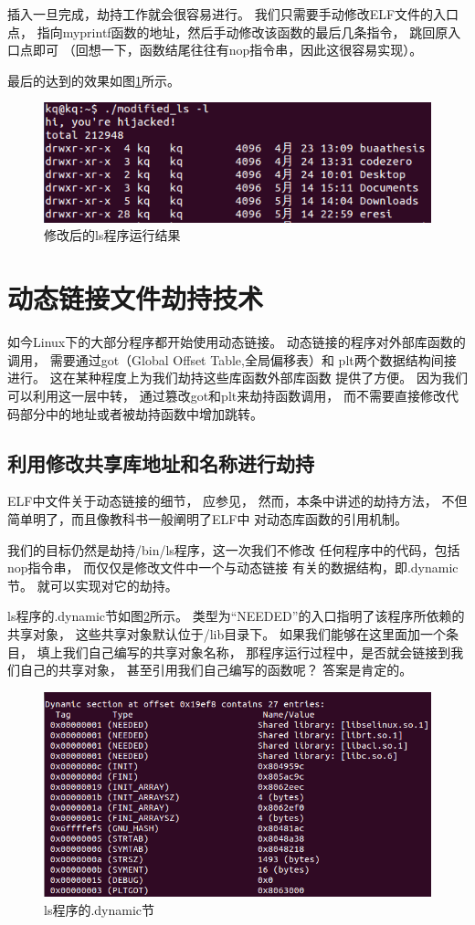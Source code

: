 插入一旦完成，劫持工作就会很容易进行。
我们只需要手动修改ELF文件的入口点，
指向myprintf函数的地址，然后手动修改该函数的最后几条指令，
跳回原入口点即可
（回想一下，函数结尾往往有nop指令串，因此这很容易实现）。

最后的达到的效果如图\ref{ls}所示。

\begin{figure}[h!]
    \centering
    \includegraphics[width=.6\textwidth]{figure/ls.png}
    \caption{修改后的ls程序运行结果}
    \label{ls}
\end{figure}

\section{动态链接文件劫持技术}

如今Linux下的大部分程序都开始使用动态链接。
动态链接的程序对外部库函数的调用，
需要通过got（Global Offset Table,全局偏移表）和
plt两个数据结构间接进行。
这在某种程度上为我们劫持这些库函数外部库函数
提供了方便。
因为我们可以利用这一层中转，
通过篡改got和plt来劫持函数调用，
而不需要直接修改代码部分中的地址或者被劫持函数中增加跳转。

\subsection{利用修改共享库地址和名称进行劫持}

ELF中文件关于动态链接的细节，
应参见\cite{elf1.2}，
然而，本条中讲述的劫持方法，
不但简单明了，而且像教科书一般阐明了ELF中
对动态库函数的引用机制。

我们的目标仍然是劫持/bin/ls程序，这一次我们不修改
任何程序中的代码，包括nop指令串，
而仅仅是修改文件中一个与动态链接
有关的数据结构，即.dynamic节。
就可以实现对它的劫持。

ls程序的.dynamic节如图\ref{lsdyn1}所示。
类型为“NEEDED”的入口指明了该程序所依赖的共享对象，
这些共享对象默认位于/lib目录下。
如果我们能够在这里面加一个条目，
填上我们自己编写的共享对象名称，
那程序运行过程中，是否就会链接到我们自己的共享对象，
甚至引用我们自己编写的函数呢？
答案是肯定的。

\begin{figure}[h!]
    \centering
    \includegraphics[width=.6\textwidth]{figure/lsdyn1.png}
    \caption{ls程序的.dynamic节}
    \label{lsdyn1}
\end{figure}



